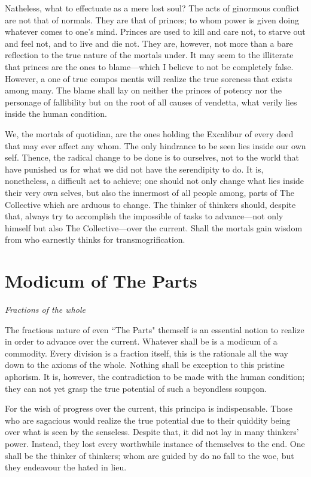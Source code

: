 \documentclass[twoside]{book}
\begin{document}
Natheless, what to effectuate as a mere lost soul? The acts of ginormous
conflict are not that of normals. They are that of princes; to whom power is
given doing whatever comes to one's mind. Princes are used to kill and care not,
to starve out and feel not, and to live and die not. They are, however, not more
than a bare reflection to the true nature of the mortals under. It may seem to
the illiterate that princes are the ones to blame—which I believe to not be
completely false. However, a one of true compos mentis will realize the true
soreness that exists among many. The blame shall lay on neither the princes of
potency nor the personage of fallibility but on the root of all causes of
vendetta, what verily lies inside the human condition.

We, the mortals of quotidian, are the ones holding the Excalibur of every deed
that may ever affect any whom. The only hindrance to be seen lies inside our own
self. Thence, the radical change to be done is to ourselves, not to the world
that have punished us for what we did not have the serendipity to do. It is,
nonetheless, a difficult act to achieve; one should not only change what lies
inside their very own selves, but also the innermost of all people among, parts
of The Collective which are arduous to change. The thinker of thinkers should,
despite that, always try to accomplish the impossible of tasks to advance—not
only himself but also The Collective—over the current. Shall the mortals gain
wisdom from who earnestly thinks for transmogrification.

\section{Modicum of The Parts}
\textit{Fractions of the whole}

The fractious nature of even ``The Parts" themself is an essential notion to
realize in order to advance over the current. Whatever shall be is a modicum of
a commodity. Every division is a fraction itself, this is the rationale all the
way down to the axioms of the whole. Nothing shall be exception to this pristine
aphorism. It is, however, the contradiction to be made with the human condition;
they can not yet grasp the true potential of such a beyondless soupçon.

For the wish of progress over the current, this principa is indispensable. Those
who are sagacious would realize the true potential due to their quiddity being
over what is seen by the senseless. Despite that, it did not lay in many
thinkers' power. Instead, they lost every worthwhile instance of themselves to
the end. One shall be the thinker of thinkers; whom are guided by do no fall to
the woe, but they endeavour the hated in lieu.
\end{document}
